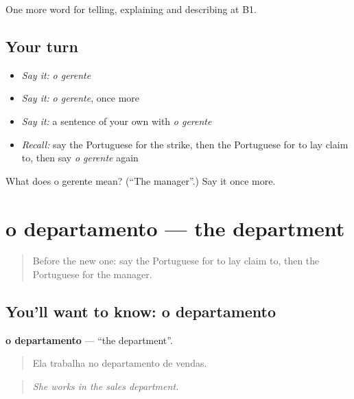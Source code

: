 \begin{grammarlens}[title={What you've built}]
One more word for telling, explaining and describing at B1.
\end{grammarlens}

\subsection*{Your turn}
\begin{itemize}
\raggedright
  \item \emph{Say it:} \emph{o gerente}
  \item \emph{Say it:} \emph{o gerente}, once more
  \item \emph{Say it:} a sentence of your own with \emph{o gerente}
  \item \emph{Recall:} say the Portuguese for the strike, then the Portuguese for to lay claim to, then say \emph{o gerente} again
\end{itemize}

\begin{tcolorbox}[breakable,colback=teal!4,colframe=teal!35!black,title={Before you move on}]
What does o gerente mean? (\textquotedblleft{}The manager\textquotedblright{}.) Say it once more.
\end{tcolorbox}
\section[o departamento]{o departamento — the department}

\label{lesson:PT-C359-departamento}



\begin{quote}
Before the new one: say the Portuguese for to lay claim to, then the Portuguese for the manager.
\end{quote}

\subsection*{You'll want to know: o departamento}
\textbf{o departamento} — \textquotedblleft{}the department\textquotedblright{}.

\begin{quote}
Ela trabalha no departamento de vendas.
\end{quote}

\begin{quote}
\emph{She works in the sales department.}
\end{quote}

